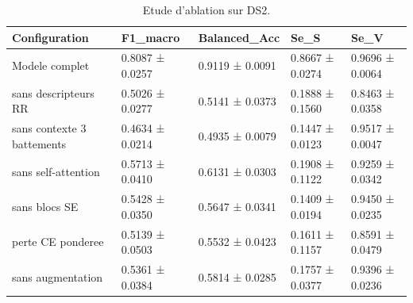 \begin{table}
\caption{Etude d'ablation sur DS2.}
\label{tab:ablation}
\begin{tabular}{lllll}
\toprule
Configuration & F1_macro & Balanced_Acc & Se_S & Se_V \\
\midrule
Modele complet & 0.8087 ± 0.0257 & 0.9119 ± 0.0091 & 0.8667 ± 0.0274 & 0.9696 ± 0.0064 \\
sans descripteurs RR & 0.5026 ± 0.0277 & 0.5141 ± 0.0373 & 0.1888 ± 0.1560 & 0.8463 ± 0.0358 \\
sans contexte 3 battements & 0.4634 ± 0.0214 & 0.4935 ± 0.0079 & 0.1447 ± 0.0123 & 0.9517 ± 0.0047 \\
sans self-attention & 0.5713 ± 0.0410 & 0.6131 ± 0.0303 & 0.1908 ± 0.1122 & 0.9259 ± 0.0342 \\
sans blocs SE & 0.5428 ± 0.0350 & 0.5647 ± 0.0341 & 0.1409 ± 0.0194 & 0.9450 ± 0.0235 \\
perte CE ponderee & 0.5139 ± 0.0503 & 0.5532 ± 0.0423 & 0.1611 ± 0.1157 & 0.8591 ± 0.0479 \\
sans augmentation & 0.5361 ± 0.0384 & 0.5814 ± 0.0285 & 0.1757 ± 0.0377 & 0.9396 ± 0.0236 \\
\bottomrule
\end{tabular}
\end{table}
